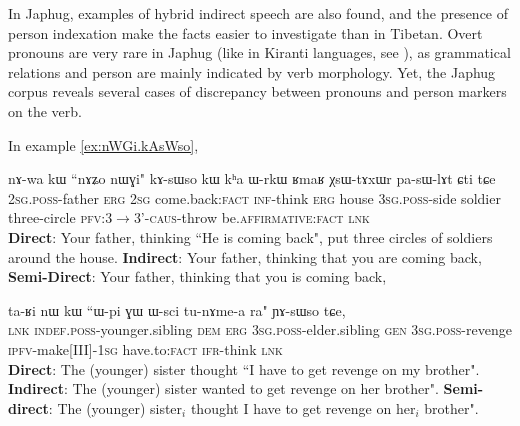 \documentclass[oldfontcommands,oneside,a4paper,11pt]{article}
\newcommand{\ipa}[1]{{\phon \mbox{#1}}} %
\begin{document}
In Japhug, examples of hybrid indirect speech are also found, and the presence of person indexation make the facts easier to investigate than in Tibetan. Overt pronouns are very rare in Japhug (like in Kiranti languages, see \citealt{bickel01deictic}), as grammatical relations and person are mainly indicated by verb morphology. Yet, the Japhug corpus reveals several cases of discrepancy between pronouns and person markers on the verb.


In example \ref{ex:nWGi.kAsWso}, 
  
\begin{exe}
\ex \label{ex:nWGi.kAsWso}
\gll 
\ipa{nɤ-wa}  	\ipa{kɯ}  	{``\ipa{nɤʑo}} 	\ipa{nɯɣi}"  	\ipa{kɤ-sɯso}  	\ipa{kɯ}  	\ipa{kʰa}  	\ipa{ɯ-rkɯ}  	\ipa{ʁmaʁ}  	\ipa{χsɯ-tɤxɯr}  	\ipa{pa-sɯ-lɤt}  	\ipa{ɕti}  	\ipa{tɕe}  \\
\textsc{2sg.poss}-father \textsc{erg} \textsc{2sg} {come.back:\textsc{fact}}  \textsc{inf}-think \textsc{erg} house \textsc{3sg.poss}-side soldier three-circle \textsc{pfv:3$\rightarrow$3'-caus}-throw be.\textsc{affirmative}:\textsc{fact} \textsc{lnk}\\
\glt \textbf{Direct}: Your father, thinking ``{He} {is coming back}",   put three circles of soldiers around the house. 
\glt  \textbf{Indirect}: Your father, thinking that {you} are coming back,
\glt  \textbf{Semi-Direct}: Your father, thinking that {you} {is coming back}, 
\end{exe}
   


\begin{exe}
\ex
\gll  \ipa{tɕe}  	\ipa{ta-ʁi}  	\ipa{nɯ}  	\ipa{kɯ}  	``{\ipa{ɯ-pi}}  	\ipa{ɣɯ}  	\ipa{ɯ-sci}  	{\ipa{tu-nɤme-a}}  	\ipa{ra}" 	\ipa{ɲɤ-sɯso}  	\ipa{tɕe,}  	\\
\textsc{lnk}  \textsc{indef.poss}-younger.sibling \textsc{dem} \textsc{erg}  {\textsc{3sg.poss}-elder.sibling}  \textsc{gen} \textsc{3sg.poss}-revenge {\textsc{ipfv}-make[III]-\textsc{1sg}} have.to:\textsc{fact} \textsc{ifr}-think \textsc{lnk} \\
\glt  \textbf{Direct}: The (younger) sister thought ``{I have to get revenge} on {my brother}".
\glt  \textbf{Indirect}:  The (younger) sister wanted to get revenge on {her brother}".
\glt  \textbf{Semi-direct}:  The (younger) sister$_i$ thought {I have to get revenge} on {her$_i$ brother}".
  \end{exe}
  
\end{document}
